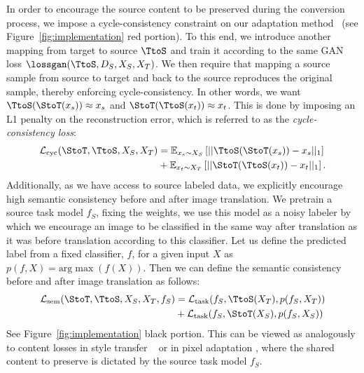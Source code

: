 In order to encourage the source content to be preserved during the conversion process, we impose a cycle-consistency constraint on our adaptation method~\citep{zhu_arxiv17,yi2017dualgan,kim_arxiv17} (see Figure~\ref{fig:implementation} red portion).
To this end, we introduce another mapping from target to source $\TtoS$ and train it according to the same GAN loss $\lossgan(\TtoS, D_S, X_S, X_T)$.
We then require that mapping a source sample from source to target and back to the source reproduces the original sample, thereby enforcing cycle-consistency.
In other words, we want $\TtoS(\StoT(x_s)) \approx x_s$ and $\StoT(\TtoS(x_t)) \approx x_t$.
This is done by imposing an L1 penalty on the reconstruction error, which is referred to as the \emph{cycle-consistency loss}:
\begin{align}
  \label{eq:cycle-loss}
  \mathcal{L}_\text{cyc}(\StoT,  \TtoS, X_S, X_T) &=
   \mathbb{E}_{x_s \sim X_S}\left[||\TtoS(\StoT(x_s)) - x_s||_1\right] \\
  &+  \mathbb{E}_{x_t \sim X_T}\left[||\StoT(\TtoS(x_t)) - x_t||_1\right].\nonumber
\end{align}
%
Additionally, as we have access to source labeled data, we explicitly encourage high semantic consistency before and after image translation. %
We pretrain a source task model $f_S$, fixing the weights, we use this model as a noisy labeler by which we encourage an image to be classified in the same way after translation as it was before translation according to this classifier. Let us define the predicted label from a fixed classifier, $f$, for a given input $X$ as $p(f,X) = \text{arg} \max(f(X))$. Then we can define the semantic consistency before and after image translation as follows:
\begin{align}
	\label{eq:semantic}
	\mathcal{L}_\text{sem}(\StoT, \TtoS, X_S, X_T, f_S) &=
	 \mathcal{L}_{\text{task}}(f_S, \TtoS(X_T), p(f_S, X_T))  \\
	&+  \mathcal{L}_{\text{task}}(f_S, \StoT(X_S), p(f_S, X_S)) \nonumber 
\end{align}
See Figure~\ref{fig:implementation} black portion. This can be viewed as analogously to content losses in style transfer ~\citep{gatys2016image} or in pixel adaptation \citep{dtn}, where the shared content to preserve is dictated by the source task model $f_S$.

